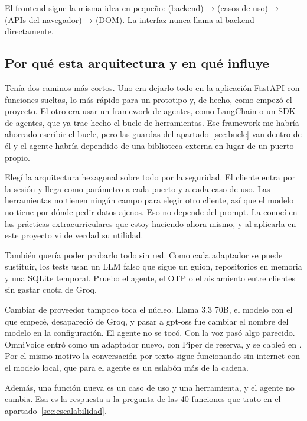 El frontend sigue la misma idea en pequeño:  (backend) →  (casos de uso) →
 (APIs del navegador) →  (DOM). La interfaz nunca llama al backend directamente.

\FloatBarrier
\subsection{Por qué esta arquitectura y en qué influye}\label{sec:por-que-hexagonal}

Tenía dos caminos más cortos. Uno era dejarlo todo en la aplicación FastAPI con funciones sueltas, lo más rápido para un
prototipo y, de hecho, como empezó el proyecto. El otro era usar un framework de agentes, como LangChain o
un SDK de agentes, que ya trae hecho el bucle de herramientas. Ese framework me habría ahorrado escribir el bucle, pero
las guardas del apartado~\ref{sec:bucle} van dentro de él y el agente habría dependido de una biblioteca externa en
lugar de un puerto propio.

Elegí la arquitectura hexagonal sobre todo por la seguridad. El cliente entra por la sesión y llega como parámetro a
cada puerto y a cada caso de uso. Las herramientas no tienen ningún campo para elegir otro cliente, así que el modelo no
tiene por dónde pedir datos ajenos. Eso no depende del prompt.
La conocí en las prácticas extracurriculares que estoy haciendo ahora mismo, y al aplicarla en este proyecto vi de
verdad su utilidad.

También quería poder probarlo todo sin red. Como cada adaptador se puede sustituir, los tests usan un LLM falso que
sigue un guion, repositorios en memoria y una SQLite temporal. Pruebo el agente, el OTP o el aislamiento entre clientes
sin gastar cuota de Groq.

Cambiar de proveedor tampoco toca el núcleo. Llama 3.3 70B, el modelo con el que empecé,
desapareció de Groq, y pasar a gpt-oss fue cambiar el nombre del modelo en la configuración. El agente no se tocó. Con la
voz pasó algo parecido. OmniVoice entró como un adaptador nuevo, con Piper de reserva, y se cableó en
. Por el mismo motivo la conversación por texto sigue funcionando sin internet con el modelo
local, que para el agente es un eslabón más de la cadena.

Además, una función nueva es un caso de uso y una herramienta, y el agente no cambia. Esa es la respuesta a la pregunta
de las 40 funciones que trato en el apartado~\ref{sec:escalabilidad}.

